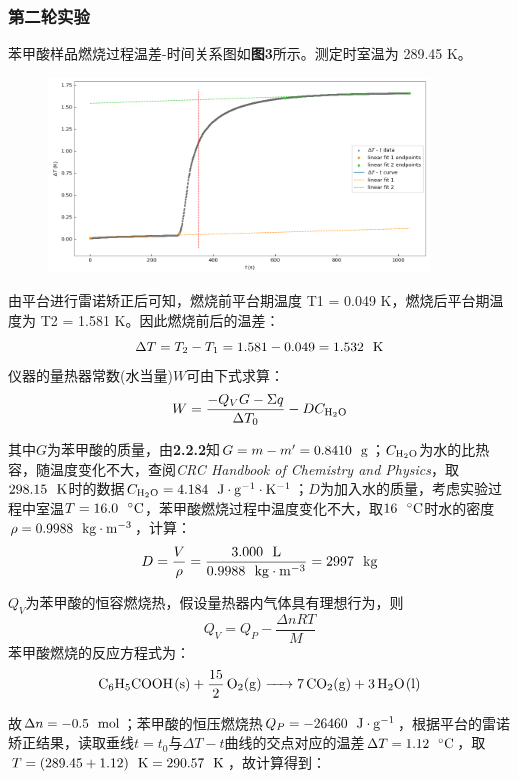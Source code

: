 \documentclass[12pt]{article}
\begin{document}
			\subsubsection{第二轮实验}
			苯甲酸样品燃烧过程温差-时间关系图如\textbf{图3}所示。测定时室温为 289.45 K。\par
			\begin{figure}[h]
				\centering
				\includegraphics[width=0.9\textwidth]{3.png}
			\end{figure}
			由平台进行雷诺矫正后可知，燃烧前平台期温度 T1 = 0.049 K，燃烧后平台期温度为 T2 = 1.581 K。因此燃烧前后的温差：
			\begin{equation}
				\Delta T = T_{2}-T_{1} = 1.581-0.049 = 1.532\ \ {\rm K}
			\end{equation}
			仪器的量热器常数(水当量)$W$可由下式求算：
			$$
			W=\frac{-Q_{V}G-\Sigma q}{\Delta T_{0}}-DC_{\rm H_{2}O}
			$$
			\par
			其中$G$为苯甲酸的质量，由\textbf{2.2.2}知$G=m-m^{\prime}=0.8410\ \ {\rm g}$；$C_{\rm H_{2}O}$为水的比热容，随温度变化不大，查阅\textit{CRC Handbook of Chemistry and Physics}\citealp{crc}，取$298.15\ \ {\rm K}$时的数据$C_{\rm H_{2}O}=4.184\ \ {\rm J\cdot g^{-1}\cdot K^{-1}}$；$D$为加入水的质量，考虑实验过程中室温$T=16.0\ \ {\rm ^{\circ}C}$，苯甲酸燃烧过程中温度变化不大，取$16\ \ {\rm ^{\circ}C}$时水的密度$\rho=0.9988\ \ {\rm kg\cdot m^{-3}}$，计算：
			$$
			D=\frac{V}{\rho}=\frac{3.000\ \ {\rm L}}{0.9988\ \ {\rm kg\cdot m^{-3}}}=2997\ \ {\rm kg}
			$$
			\par
			$Q_{V}$为苯甲酸的恒容燃烧热，假设量热器内气体具有理想行为，则
			$$
			Q_{V}=Q_{P}-\frac{\Delta n RT}{M}
			$$
			苯甲酸燃烧的反应方程式为：
			$$
			\ce{C6H5COOH(s) +  15/2 O2(g) -> 7 CO2(g) + 3 H2O(l)}
			$$
			\par
			故$\Delta n=-0.5\ \ {\rm mol}$；苯甲酸的恒压燃烧热$Q_{P}=-26460\ \ {\rm J\cdot g^{-1}}$，根据平台的雷诺矫正结果，读取垂线$t=t_{0}$与$\Delta T-t$曲线的交点对应的温差$\Delta T=1.12\ \ {\rm ^{\circ}C}$，取$T=(289.45+1.12)\ \ {\rm K}=290.57\ \ {\rm K}$，故计算得到：
\end{document}
